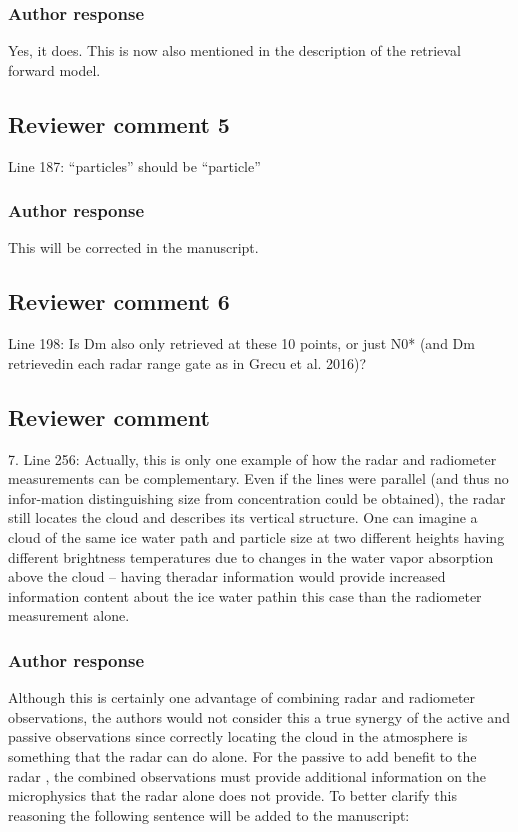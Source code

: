 \documentclass[11pt]{scrartcl}
\begin{document}
\subsubsection*{Author response}
Yes, it does. This is now also mentioned in the description of the retrieval forward model.

\subsection*{Reviewer comment 5}
Line 187: “particles” should be “particle”

\subsubsection*{Author response}
This will be corrected in the manuscript.

\subsection{Reviewer comment 6}
Line 198: Is Dm also only retrieved at these 10 points, or just N0* (and Dm retrievedin each radar range gate as in Grecu et al. 2016)?

\subsection{Reviewer comment}
7.  Line 256:  Actually, this is only one example of how the radar and radiometer measurements can be complementary.  Even if the lines were parallel (and thus no infor-mation distinguishing size from concentration could be obtained), the radar still locates the cloud and describes its vertical structure.  One can imagine a cloud of the same ice water path and particle size at two different heights having different brightness temperatures due to changes in the water vapor absorption above the cloud – having theradar information would provide increased information content about the ice water pathin this case than the radiometer measurement alone.

\subsubsection*{Author response}
Although this is certainly one advantage of combining radar and radiometer
observations, the authors would not consider this a true synergy of the active
and passive observations since correctly locating the cloud in the atmosphere is
something that the radar can do alone. For the passive to add benefit to the
radar , the combined observations must provide additional information on the
microphysics that the radar alone does not provide. To better clarify this
reasoning the following sentence will be added to the manuscript:
\end{document}
